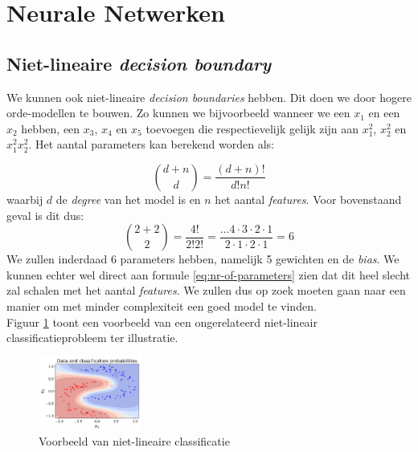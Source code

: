 \section{Neurale Netwerken}

\subsection{Niet-lineaire \textit{decision boundary}}

We kunnen ook niet-lineaire \textit{decision boundaries} hebben. Dit doen we door hogere orde-modellen te bouwen. Zo kunnen we bijvoorbeeld wanneer we een $x_{1}$ en een $x_{2}$ hebben, een $x_{3}$, $x_{4}$ en $x_{5}$ toevoegen die respectievelijk gelijk zijn aan $x_{1}^{2}$, $x_{2}^{2}$ en $x_{1}^{2} x_{2}^{2}$. Het aantal parameters kan berekend worden als:

\begin{equation}
	{d + n \choose d} = \frac{(d+n)!}{d! n!}
	\label{eq:nr-of-parameters}
\end{equation}
\noindent
waarbij $d$ de \textit{degree} van het model is en $n$ het aantal \textit{features}. Voor bovenstaand geval is dit dus: 
\begin{equation*}
	{2 + 2 \choose 2} = \frac{4!}{2! 2!} = \frac{\ldots4\cdot 3\cdot 2\cdot 1}{2\cdot 1\cdot 2\cdot 1} = 6
\end{equation*}
\newpage
\noindent
We zullen inderdaad 6 parameters hebben, namelijk 5 gewichten en de \textit{bias}. We kunnen echter wel direct aan formule \ref{eq:nr-of-parameters} zien dat dit heel slecht zal schalen met het aantal \textit{features}. We zullen dus op zoek moeten gaan naar een manier om met minder complexiteit een goed model te vinden. \\
\newline
Figuur \ref{fig:non-linear-classification} toont een voorbeeld van een ongerelateerd niet-lineair classificatieprobleem ter illustratie.
\begin{figure}[h]
	\centering
	\includegraphics[width=0.3\textwidth]{images/12-non-linear-classification.png}
	\caption{Voorbeeld van niet-lineaire classificatie}
	\label{fig:non-linear-classification}
\end{figure}

